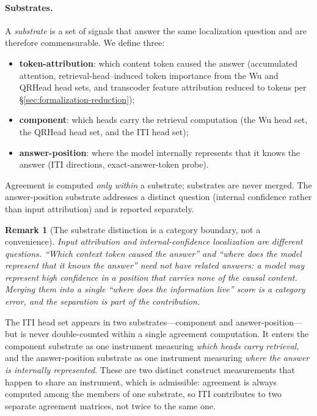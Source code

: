 \documentclass[11pt]{article}
\newtheorem{remark}{Remark}
\begin{document}
\paragraph{Substrates.}
A \emph{substrate} is a set of signals that answer the same localization
question and are therefore commensurable. We define three:
\begin{itemize}
  \item \textbf{token-attribution}: which content token caused the answer
  (accumulated attention, retrieval-head--induced token importance from the
  Wu and QRHead head sets, and transcoder feature attribution reduced to
  tokens per \S\ref{sec:formalization-reduction});
  \item \textbf{component}: which heads carry the retrieval computation
  (the Wu head set, the QRHead head set, and the ITI head set);
  \item \textbf{answer-position}: where the model internally represents that
  it knows the answer (ITI directions, exact-answer-token probe).
\end{itemize}
Agreement is computed \emph{only within} a substrate; substrates are never
merged. The answer-position substrate addresses a distinct question
(internal confidence rather than input attribution) and is reported
separately.

\begin{remark}[The substrate distinction is a category boundary, not a
convenience]
Input attribution and internal-confidence localization are different
questions. ``Which context token caused the answer'' and ``where does the
model represent that it knows the answer'' need not have related answers:
a model may represent high confidence in a position that carries none of the
causal content. Merging them into a single ``where does the information
live'' score is a category error, and the separation is part of the
contribution.
\end{remark}

The ITI head set appears in two substrates---component and
answer-position---but is never double-counted within a single agreement
computation. It enters the component substrate as one instrument measuring
\emph{which heads carry retrieval}, and the answer-position substrate as one
instrument measuring \emph{where the answer is internally represented}.
These are two distinct construct measurements that happen to share an
instrument, which is admissible: agreement is always computed among the
members of one substrate, so ITI contributes to two separate agreement
matrices, not twice to the same one.
\end{document}
